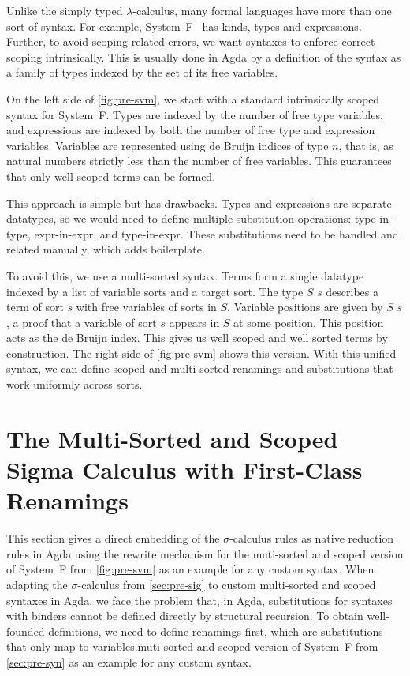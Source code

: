 \documentclass[screen,nonacm]{acmart}
\begin{document}
Unlike the simply typed $\lambda$-calculus, many formal languages have more
than one sort of syntax. For example, System~F~\cite{girard1972} has kinds,
types and expressions. Further, to avoid scoping related errors, we want
syntaxes to enforce correct scoping intrinsically. This is usually done in Agda
by a definition of the syntax as a family of types indexed by the set of its
free variables.

On the left side of \cref{fig:pre-svm}, we start with a standard intrinsically
scoped syntax for System~F. Types are indexed by the number of free type
variables, and expressions are indexed by both the number of free type and
expression variables. Variables are represented using de Bruijn indices of type
 $n$, that is, as natural numbers strictly less than the
number of free variables. This guarantees that only well scoped terms can be
formed.

This approach is simple but has drawbacks. Types and expressions are separate
datatypes, so we would need to define multiple substitution operations:
type-in-type, expr-in-expr, and type-in-expr. These substitutions need to be
handled and related manually, which adds boilerplate.

To avoid this, we use a multi-sorted syntax. Terms form a single datatype
indexed by a list of variable sorts and a target sort. The type $S$  $s$
describes a term of sort $s$ with free variables of sorts in $S$. Variable
positions are given by $S$  $s$, a proof that a variable of sort $s$ appears
in $S$ at some position. This position acts as the de Bruijn index. This gives
us well scoped and well sorted terms by construction. The right side of
\cref{fig:pre-svm} shows this version. With this unified syntax, we can define
scoped and multi-sorted renamings and substitutions that work uniformly across
sorts.

\section{The Multi-Sorted and Scoped Sigma Calculus with First-Class Renamings}\label{sec:mis}

This section gives a direct embedding of the $\sigma$-calculus rules as native
reduction rules in Agda using the rewrite mechanism for the
muti-sorted and scoped version of System~F from \cref{fig:pre-svm} as an
example for any custom syntax. When adapting the $\sigma$-calculus from
\cref{sec:pre-sig} to custom multi-sorted and scoped syntaxes in Agda, we face
the problem that, in Agda, substitutions for syntaxes with binders cannot be
defined directly by structural recursion. To obtain well-founded definitions,
we need to define renamings first, which are substitutions that only map to
variables.muti-sorted and scoped version of System~F from \cref{sec:pre-syn} as
an example for any custom syntax.
\end{document}
